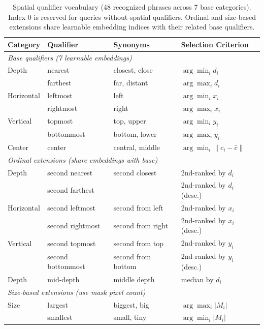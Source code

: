 \begin{table}[h]
\centering
\caption{Spatial qualifier vocabulary (48 recognized phrases across 7 base categories). Index 0 is reserved for queries without spatial qualifiers. Ordinal and size-based extensions share learnable embedding indices with their related base qualifiers.}
\small
\begin{tabular}{@{}llll@{}}
\toprule
\textbf{Category} & \textbf{Qualifier} & \textbf{Synonyms} & \textbf{Selection Criterion} \\
\midrule
\multicolumn{4}{l}{\textit{Base qualifiers (7 learnable embeddings)}} \\
Depth & nearest & closest, close & $\arg\min_i d_i$ \\
      & farthest & far, distant & $\arg\max_i d_i$ \\
Horizontal & leftmost & left & $\arg\min_i x_i$ \\
           & rightmost & right & $\arg\max_i x_i$ \\
Vertical & topmost & top, upper & $\arg\min_i y_i$ \\
         & bottommost & bottom, lower & $\arg\max_i y_i$ \\
Center & center & central, middle & $\arg\min_i \|c_i - \bar{c}\|$ \\
\midrule
\multicolumn{4}{l}{\textit{Ordinal extensions (share embeddings with base)}} \\
Depth & second nearest & second closest & 2nd-ranked by $d_i$ \\
      & second farthest & & 2nd-ranked by $d_i$ (desc.) \\
Horizontal & second leftmost & second from left & 2nd-ranked by $x_i$ \\
           & second rightmost & second from right & 2nd-ranked by $x_i$ (desc.) \\
Vertical & second topmost & second from top & 2nd-ranked by $y_i$ \\
         & second bottommost & second from bottom & 2nd-ranked by $y_i$ (desc.) \\
Depth & mid-depth & middle depth & median by $d_i$ \\
\midrule
\multicolumn{4}{l}{\textit{Size-based extensions (use mask pixel count)}} \\
Size & largest & biggest, big & $\arg\max_i |M_i|$ \\
     & smallest & small, tiny & $\arg\min_i |M_i|$ \\
\bottomrule
\end{tabular}
\end{table}

